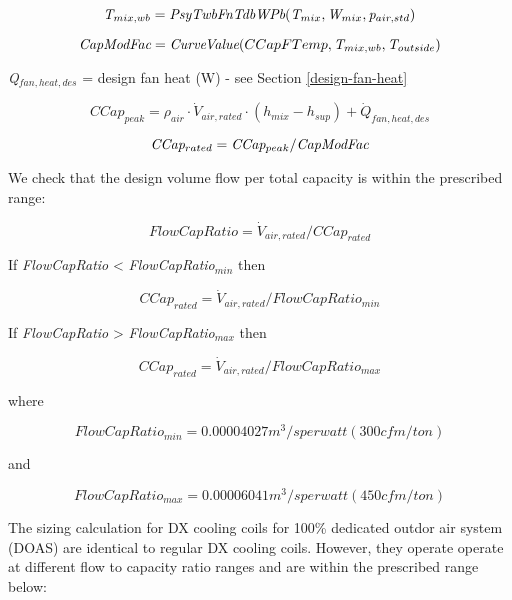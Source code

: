 \begin{equation}
\emph{T\(_{mix,wb}\)} = \emph{PsyTwbFnTdbWPb}(\emph{T\(_{mix}\)},\emph{W\(_{mix}\)}, \emph{p\(_{air,std}\)})
\end{equation}

\begin{equation}
\emph{CapModFac} = \emph{CurveValue}(CCapFTemp,\emph{T\(_{mix,wb}\)},\emph{T\(_{outside}\)})
\end{equation}

\emph{Q\(_{fan,heat,des}\)} = design fan heat (W) - see Section \ref{design-fan-heat}

\begin{equation}
CCap_{peak} = \rho_{air} \cdot \dot V_{air,rated} \cdot (h_{mix} - h_{sup}) + \dot{Q}_{fan,heat,des}
\end{equation}

\begin{equation}
\emph{CCap\(_{rated}\)} = \emph{CCap\(_{peak}\)}/ \emph{CapModFac}
\end{equation}

We check that the design volume flow per total capacity is within the prescribed range:

\begin{equation}
FlowCapRatio = \dot V_{air,rated}/CCap_{rated}
\end{equation}

If \emph{FlowCapRatio} \textless{} \emph{FlowCapRatio\(_{min}\)} then

\begin{equation}
CCap_{rated} = \dot V_{air,rated}/FlowCapRatio_{min}
\end{equation}

If \emph{FlowCapRatio} \textgreater{} \emph{FlowCapRatio\(_{max}\)} then

\begin{equation}
CCap_{rated} = \dot V_{air,rated}/FlowCapRatio_{max}
\end{equation}

where

\begin{equation}
FlowCapRatio_{min} = 0.00004027 m^{3}/s per watt (300 cfm/ton)
\end{equation}

and

\begin{equation}
FlowCapRatio_{max} = 0.00006041 m^{3}/s per watt (450 cfm/ton)
\end{equation}

The sizing calculation for DX cooling coils for 100\% dedicated outdor air system (DOAS) are identical to regular DX cooling coils. However, they operate operate at different flow to capacity ratio ranges and are within the prescribed range below:

